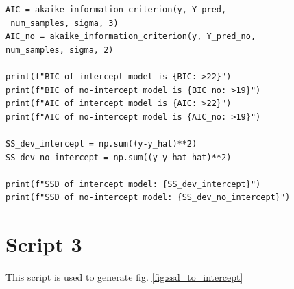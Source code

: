 \documentclass[12pt,a4paper,oneside]{book} %
\begin{document}
\begin{mdframed}[linecolor=black, topline=true, bottomline=true,
	leftline=false, rightline=false, backgroundcolor=yellow!20!white]
\begin{verbatim}
AIC = akaike_information_criterion(y, Y_pred,
 num_samples, sigma, 3)
AIC_no = akaike_information_criterion(y, Y_pred_no, 
num_samples, sigma, 2)

print(f"BIC of intercept model is {BIC: >22}")
print(f"BIC of no-intercept model is {BIC_no: >19}")
print(f"AIC of intercept model is {AIC: >22}")
print(f"AIC of no-intercept model is {AIC_no: >19}")

SS_dev_intercept = np.sum((y-y_hat)**2)
SS_dev_no_intercept = np.sum((y-y_hat_hat)**2)

print(f"SSD of intercept model: {SS_dev_intercept}")
print(f"SSD of no-intercept model: {SS_dev_no_intercept}")

	\end{verbatim}
\end{mdframed}
	
	
	

\section{Script 3}
	
	This script is used to generate fig. \ref{fig:ssd_to_intercept}
	
\end{document}

